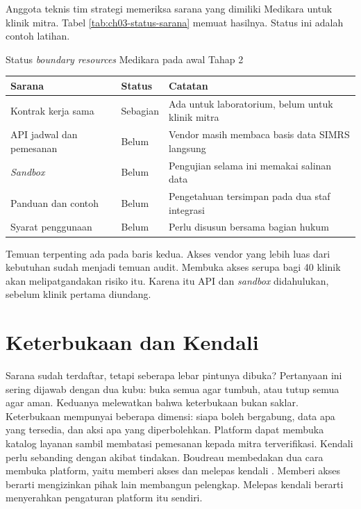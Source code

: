 \begin{kasus}[title={Kasus Medikara Health: Yang Sudah Ada dan yang Belum}]
Anggota teknis tim strategi memeriksa sarana yang dimiliki Medikara untuk klinik mitra. Tabel
\ref{tab:ch03-status-sarana} memuat hasilnya. Status ini adalah contoh latihan.

\begin{center}
  \captionsetup{type=table}
  \caption{Status \textit{boundary resources} Medikara pada awal Tahap 2}
  \label{tab:ch03-status-sarana}
  \small
  \begin{tabularx}{\linewidth}{Z{3.2cm}Z{1.6cm}Y}
    \hline
    \textbf{Sarana} & \textbf{Status} & \textbf{Catatan} \\ \hline
    Kontrak kerja sama & Sebagian & Ada untuk laboratorium, belum untuk klinik mitra \\ \hline
    API jadwal dan pemesanan & Belum & Vendor masih membaca basis data SIMRS langsung \\ \hline
    \textit{Sandbox} & Belum & Pengujian selama ini memakai salinan data \\ \hline
    Panduan dan contoh & Belum & Pengetahuan tersimpan pada dua staf integrasi \\ \hline
    Syarat penggunaan & Belum & Perlu disusun bersama bagian hukum \\ \hline
  \end{tabularx}
\end{center}

Temuan terpenting ada pada baris kedua. Akses vendor yang lebih luas dari kebutuhan sudah menjadi
temuan audit. Membuka akses serupa bagi 40 klinik akan melipatgandakan risiko itu. Karena itu API dan
\textit{sandbox} didahulukan, sebelum klinik pertama diundang.
\end{kasus}

\section{Keterbukaan dan Kendali}

Sarana sudah terdaftar, tetapi seberapa lebar pintunya dibuka? Pertanyaan ini sering dijawab dengan
dua kubu: buka semua agar tumbuh, atau tutup semua agar aman. Keduanya melewatkan bahwa keterbukaan
bukan saklar. Keterbukaan mempunyai beberapa dimensi: siapa boleh bergabung, data apa yang tersedia, dan aksi apa
yang diperbolehkan. Platform dapat membuka katalog layanan sambil membatasi pemesanan kepada mitra
terverifikasi. Kendali perlu sebanding dengan akibat tindakan. Boudreau membedakan dua cara membuka
platform, yaitu memberi akses dan melepas kendali \cite{c03-boudreau2010open}. Memberi akses berarti
mengizinkan pihak lain membangun pelengkap. Melepas kendali berarti menyerahkan pengaturan platform
itu sendiri.

